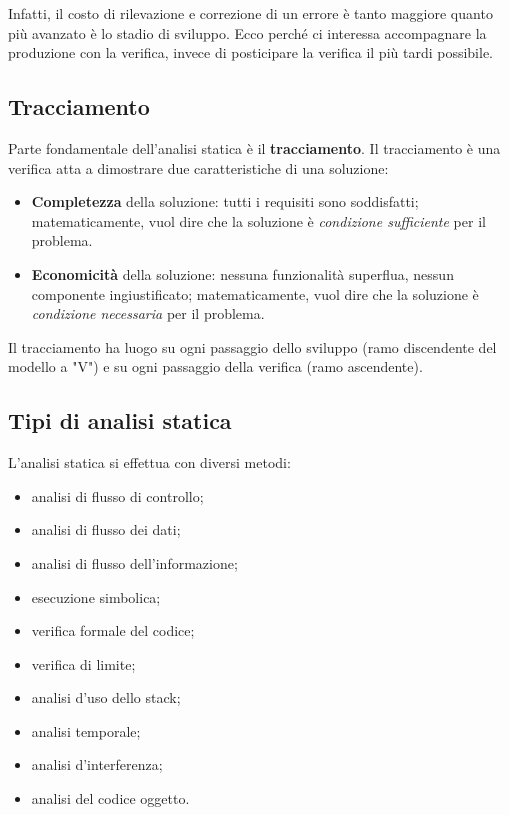 \documentclass[a4paper]{article}
\begin{document}
Infatti, il costo di rilevazione e correzione di un errore è tanto maggiore quanto più avanzato è lo stadio di sviluppo. Ecco perché ci interessa accompagnare la produzione con la verifica, invece di posticipare la verifica il più tardi possibile.

		
	\subsection{Tracciamento}

		
Parte fondamentale dell'analisi statica è il \textbf{tracciamento}. Il tracciamento è una verifica atta a dimostrare due caratteristiche di una soluzione:
		
	\begin{itemize}
		
			
	\item \textbf{Completezza} della soluzione: tutti i requisiti sono soddisfatti; matematicamente, vuol dire che la soluzione è \emph{condizione sufficiente} per il problema.
			
	\item \textbf{Economicità} della soluzione: nessuna funzionalità superflua, nessun componente ingiustificato; matematicamente, vuol dire che la soluzione è \emph{condizione necessaria} per il problema.
		
	\end{itemize}

		
Il tracciamento ha luogo su ogni passaggio dello sviluppo (ramo discendente del modello a "V") e su ogni passaggio della verifica (ramo ascendente).

		
	\subsection{Tipi di analisi statica}

		
L'analisi statica si effettua con diversi metodi:
		
	\begin{itemize}
		
			
	\item analisi di flusso di controllo;
			
	\item analisi di flusso dei dati;
			
	\item analisi di flusso dell'informazione;
			
	\item esecuzione simbolica;
			
	\item verifica formale del codice;
			
	\item verifica di limite;
			
	\item analisi d'uso dello stack;
			
	\item analisi temporale;
			
	\item analisi d'interferenza;
			
	\item analisi del codice oggetto.
		
	\end{itemize}
\end{document}
